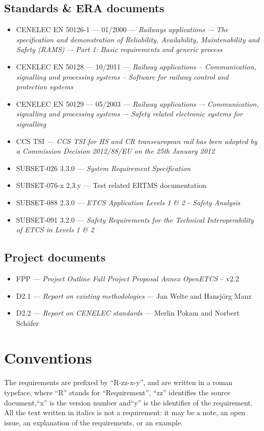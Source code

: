 \documentclass{template/openetcs_article}
\begin{document}
\subsection{Standards \& ERA documents}
\label{standards}
\begin{itemize}
\item CENELEC EN 50126-1 --- 01/2000 --- \emph{Railways applications –- The specification and 
demonstration of Reliability, Availability, Maintenability and Safety (RAMS) –- Part 1: 
Basic requirements and generic process}
\item CENELEC EN 50128 --- 10/2011 --- \emph{Railway applications -- Communication, signalling and 
processing systems -- Software for railway control and protection systems}
\item CENELEC EN 50129 --- 05/2003 --- \emph{Railway applications –- Communication, signalling and 
processing systems –- Safety related electronic systems for signalling}
\item CCS TSI --- \emph{ CCS TSI for HS and CR transeuropean rail has been adopted by a Commission Decision 2012/88/EU on the 25th January 2012}
\item SUBSET-026 3.3.0 --- \emph{System Requirement Specification}
\item SUBSET-076-x 2.3.y --- Test related ERTMS documentation
\item SUBSET-088 2.3.0 --- \emph{ETCS Application Levels 1 \& 2 - Safety Analysis}
\item SUBSET-091 3.2.0 --- \emph{Safety Requirements for the Technical Interoperability
of ETCS in Levels 1 \& 2}
\end{itemize}
\subsection{Project documents}
\begin{itemize}
\item FPP --- \emph{Project Outline Full Project Proposal Annex OpenETCS} -- v2.2
\item D2.1 --- \emph{Report on existing methodologies} --- Jan Welte and Hansj\"org Manz
\item D2.2 --- \emph{Report on CENELEC standards} --- Merlin Pokam and Norbert Sch\"afer
\end{itemize}

\section{Conventions}
The requirements are prefixed by “R-zz-x-y”, and are written in a roman typeface, where ``R'' 
stands for ``Requirement'', ``zz'' identifies the source document,``x'' 
is the version number and``y'' is the identifier of the requirement. All the text 
written in italics is not a requirement: it may be a note, an open issue, an 
explanation of the requirements, or an example.
\end{document}
